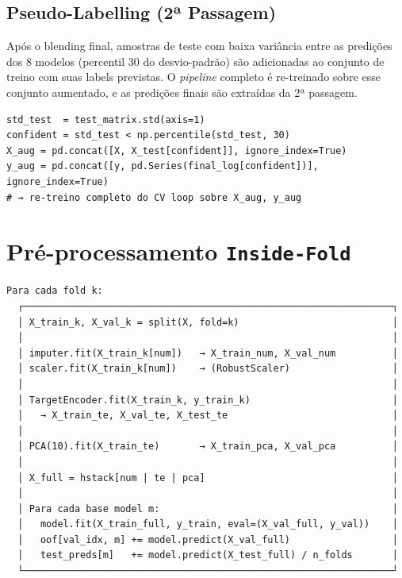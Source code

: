 \documentclass[12pt,a4paper]{article}
\begin{document}
\subsection{Pseudo-Labelling (2ª Passagem)}
\label{sec:org9f3736d}

Após o blending final, amostras de teste com baixa variância entre as
predições dos 8 modelos (percentil 30 do desvio-padrão) são adicionadas ao
conjunto de treino com suas labels previstas. O \emph{pipeline} completo é
re-treinado sobre esse conjunto aumentado, e as predições finais são extraídas
da 2ª passagem.

\begin{verbatim}
std_test  = test_matrix.std(axis=1)
confident = std_test < np.percentile(std_test, 30)
X_aug = pd.concat([X, X_test[confident]], ignore_index=True)
y_aug = pd.concat([y, pd.Series(final_log[confident])], ignore_index=True)
# → re-treino completo do CV loop sobre X_aug, y_aug
\end{verbatim}
\section{Pré-processamento \texttt{Inside-Fold}}
\label{sec:org752206c}

\begin{verbatim}
Para cada fold k:
  ┌─────────────────────────────────────────────────────────────────┐
  │ X_train_k, X_val_k = split(X, fold=k)                           │
  │                                                                 │
  │ imputer.fit(X_train_k[num])   → X_train_num, X_val_num          │
  │ scaler.fit(X_train_k[num])    → (RobustScaler)                  │
  │                                                                 │
  │ TargetEncoder.fit(X_train_k, y_train_k)                         │
  │   → X_train_te, X_val_te, X_test_te                             │
  │                                                                 │
  │ PCA(10).fit(X_train_te)       → X_train_pca, X_val_pca          │
  │                                                                 │
  │ X_full = hstack[num | te | pca]                                 │
  │                                                                 │
  │ Para cada base model m:                                         │
  │   model.fit(X_train_full, y_train, eval=(X_val_full, y_val))    │
  │   oof[val_idx, m] += model.predict(X_val_full)                  │
  │   test_preds[m]   += model.predict(X_test_full) / n_folds       │
  └─────────────────────────────────────────────────────────────────┘
\end{verbatim}
\end{document}
